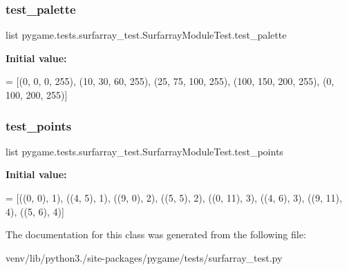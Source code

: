\subsubsection{\texorpdfstring{test\+\_\+palette}{test\_palette}}
{\footnotesize\ttfamily list pygame.\+tests.\+surfarray\+\_\+test.\+Surfarray\+Module\+Test.\+test\+\_\+palette\hspace{0.3cm}{\ttfamily [static]}}

{\bfseries Initial value\+:}
\begin{DoxyCode}
=  [(0, 0, 0, 255),
                        (10, 30, 60, 255),
                        (25, 75, 100, 255),
                        (100, 150, 200, 255),
                        (0, 100, 200, 255)]
\end{DoxyCode}
\mbox{\label{classpygame_1_1tests_1_1surfarray__test_1_1_surfarray_module_test_a1110f605b0348bdba5701b032937a63a}} 
\subsubsection{\texorpdfstring{test\+\_\+points}{test\_points}}
{\footnotesize\ttfamily list pygame.\+tests.\+surfarray\+\_\+test.\+Surfarray\+Module\+Test.\+test\+\_\+points\hspace{0.3cm}{\ttfamily [static]}}

{\bfseries Initial value\+:}
\begin{DoxyCode}
=  [((0, 0), 1), ((4, 5), 1), ((9, 0), 2),
                       ((5, 5), 2), ((0, 11), 3), ((4, 6), 3),
                       ((9, 11), 4), ((5, 6), 4)]
\end{DoxyCode}


The documentation for this class was generated from the following file\+:\begin{DoxyCompactItemize}
\item 
venv/lib/python3./site-\/packages/pygame/tests/surfarray\+\_\+test.\+py\end{DoxyCompactItemize}
